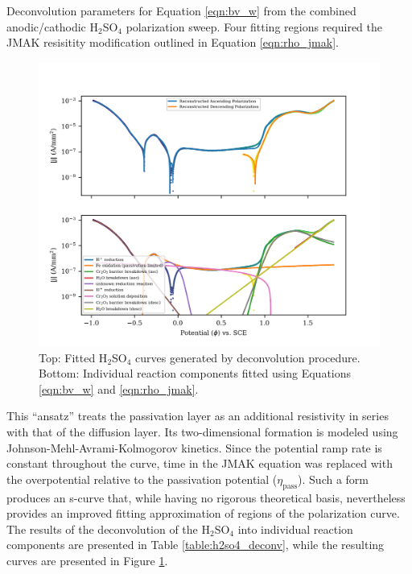 	\begin{table}[h!]
		\centering
		
		
		\caption{Deconvolution parameters for Equation \ref{eqn:bv_w} from the combined anodic/cathodic H$_2$SO$_4$ polarization sweep.  Four fitting regions required the JMAK resisitity modification outlined in Equation \ref{eqn:rho_jmak}.}
		\label{table:h2so4_deconv}
	\end{table}

	\begin{figure}[h!]
		\centering
		\includegraphics[width=5.0in]{resources/fig_2a1.png}
		\caption{Top: Fitted H$_2$SO$_4$ curves generated by deconvolution procedure.  Bottom: Individual reaction components fitted using Equations \ref{eqn:bv_w} and \ref{eqn:rho_jmak}.}
		\label{fig:h2so4_deconv}
	\end{figure}
This ``ansatz'' treats the passivation layer as an additional resistivity in series with that of the diffusion layer.  Its two-dimensional formation is modeled using Johnson-Mehl-Avrami-Kolmogorov kinetics.\cite{labguide_1}  Since the potential ramp rate is constant throughout the curve, time in the JMAK equation was replaced with the overpotential relative to the passivation potential ($\eta_{\text{pass}}$).  Such a form produces an s-curve that, while having no rigorous theoretical basis, nevertheless provides an improved fitting approximation of regions of the polarization curve.  The results of the deconvolution of the H$_2$SO$_4$ into individual reaction components are presented in Table \ref{table:h2so4_deconv}, while the resulting curves are presented in Figure \ref{fig:h2so4_deconv}.

